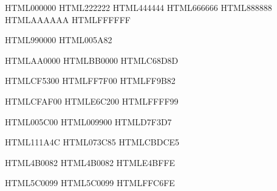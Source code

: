 %

\definecolor{black}          {HTML}{000000}
\definecolor{verydarkgrey} 	{HTML}{222222}
\definecolor{darkgrey}     	{HTML}{444444}
\definecolor{grey}         	{HTML}{666666}
\definecolor{lightgrey}    	{HTML}{888888}
\definecolor{verylightgrey}	{HTML}{AAAAAA}
\definecolor{white}        	{HTML}{FFFFFF}

\definecolor{brickred}     	{HTML}{990000}
\definecolor{steelblue}    	{HTML}{005A82}

\definecolor{mydarkred}    	{HTML}{AA0000}
\definecolor{myred}        	{HTML}{BB0000}
\definecolor{mylightred}   	{HTML}{C68D8D}

\definecolor{mydarkorange} 	{HTML}{CF5300}
\definecolor{myorange}     	{HTML}{FF7F00}
\definecolor{mylightorange}	{HTML}{FF9B82}

\definecolor{mydarkyellow} 	{HTML}{CFAF00}
\definecolor{myyellow}     	{HTML}{E6C200}
\definecolor{mylightyellow}	{HTML}{FFFF99}

\definecolor{mydarkgreen}  	{HTML}{005C00}
\definecolor{mygreen}      	{HTML}{009900}
\definecolor{mylightgreen} 	{HTML}{D7F3D7}

\definecolor{mydarkblue}   	{HTML}{111A4C}
\definecolor{myblue}       	{HTML}{073C85}
\definecolor{mylightblue}  	{HTML}{CBDCE5}

\definecolor{mydarkindigo} 	{HTML}{4B0082}
\definecolor{myindigo}     	{HTML}{4B0082}
\definecolor{mylightindigo}	{HTML}{E4BFFE}

\definecolor{mydarkviolet} 	{HTML}{5C0099}
\definecolor{myviolet}     	{HTML}{5C0099}
\definecolor{mylightviolet}	{HTML}{FFC6FE}
